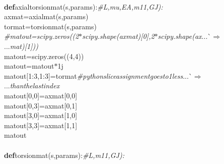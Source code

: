 {{\begin{tabbing}
\\
{\textbf{def}}\hspace{5pt}axialtorsionmat(s,params):{\it{\#L,mu,EA,m11,GJ):
}}\\
\hspace{20pt}axmat=axialmat(s,params)
\\
\hspace{20pt}tormat=torsionmat(s,params)
\\
{\it{\#\hspace{20pt}matout=scipy.zeros((2$\ast$scipy.shape(axmat){[}0{]},2$\ast$scipy.shape(ax}}{}...\`$\Rightarrow$\\
...{}{\it{mat){[}1{]}))
}}\\
\hspace{20pt}matout=scipy.zeros((4,4))
\\
\hspace{20pt}matout=matout$\ast$1j
\\
\hspace{20pt}matout{[}1:3,1:3{]}=tormat{\it{\#python\hspace{5pt}slice\hspace{5pt}assignment\hspace{5pt}goes\hspace{5pt}to\hspace{5pt}1\hspace{5pt}less}}{}...\`$\Rightarrow$\\
...{}{\it{\hspace{5pt}than\hspace{5pt}the\hspace{5pt}last\hspace{5pt}index
}}\\
\hspace{20pt}matout{[}0,0{]}=axmat{[}0,0{]}
\\
\hspace{20pt}matout{[}0,3{]}=axmat{[}0,1{]}
\\
\hspace{20pt}matout{[}3,0{]}=axmat{[}1,0{]}
\\
\hspace{20pt}matout{[}3,3{]}=axmat{[}1,1{]}
\\
\hspace{5pt}matout
\\
\hspace{60pt}
\\
{\textbf{def}}\hspace{5pt}torsionmat(s,params):{\it{\#L,m11,GJ):
}}
\end{tabbing}}}
